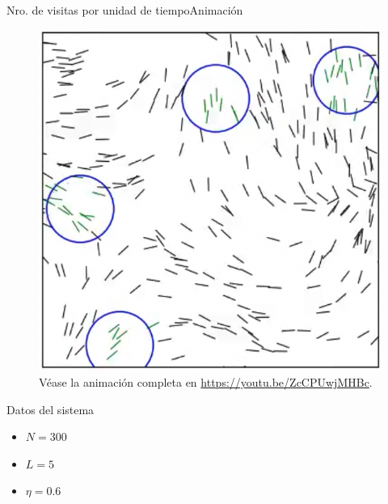 \documentclass{beamer}
\begin{document}
            \begin{frame}{Nro. de visitas por unidad de tiempo}{Animación}
                \begin{minipage}[t]{0.60\textwidth}
                    \begin{figure}[H!]
                        \includegraphics[height=.65\textheight]{./animation_visits_obc-n300-eta0p6-frame}
                        \caption*{Véase la animación completa en \url{https://youtu.be/ZcCPUwjMHBc}.}
                        \label{fig:obc_1}
                    \end{figure}
                \end{minipage}
                \hfill
                \begin{minipage}[t]{0.30\textwidth}
                    \begin{block}{Datos del sistema}
                        \begin{itemize}
                            \item $N=300$
                            \item $L=5$
                            \item $\eta=0.6$
                        \end{itemize}
                    \end{block}
                \end{minipage}
            \end{frame}
\end{document}
